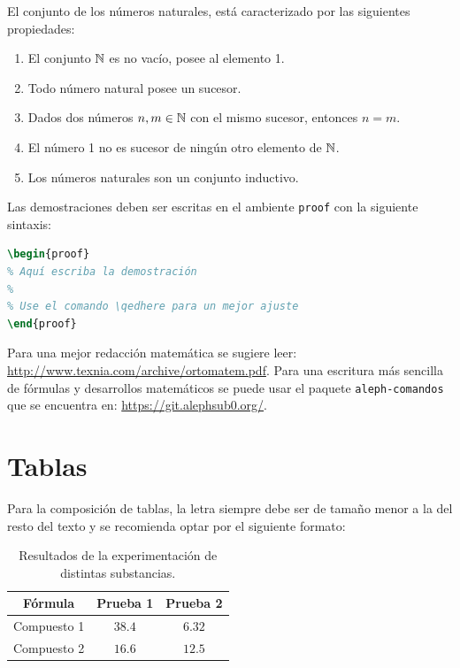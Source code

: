 \documentclass{aleph-revista}
\begin{document}
\begin{axioma}
    El conjunto de los números naturales, está caracterizado por las siguientes propiedades:
    \begin{enumerate}
    \item
        El conjunto $\mathbb{N}$ es no vacío, posee al elemento 1.
    \item
        Todo número natural posee un sucesor.
    \item
        Dados dos números $n,m\in\mathbb{N}$ con el mismo sucesor, entonces $n=m$.
    \item
        El número 1 no es sucesor de ningún otro elemento de $\mathbb{N}$.
    \item
        Los números naturales son un conjunto inductivo.
    \end{enumerate}
\end{axioma}

Las demostraciones deben ser escritas en el ambiente \texttt{proof} con la siguiente sintaxis:

\begin{lstlisting}[language=TeX]
\begin{proof}
% Aquí escriba la demostración
%
% Use el comando \qedhere para un mejor ajuste
\end{proof}
\end{lstlisting}

Para una mejor redacción matemática se sugiere leer: \url{http://www.texnia.com/archive/ortomatem.pdf}. Para una escritura más sencilla de fórmulas y desarrollos matemáticos se puede usar el paquete \texttt{aleph-comandos} que se encuentra en: \url{https://git.alephsub0.org/}. 

\section{Tablas}

Para la composición de tablas, la letra siempre debe ser de tamaño menor a la del resto del texto y se recomienda optar por el siguiente formato:

\begin{table}[H]
    \centering\small
    \begin{tabular}{ccc}
    \toprule
        \textbf{Fórmula} & \textbf{Prueba 1} & \textbf{Prueba 2} \\ 
    \midrule
        Compuesto 1 & $38.4$  &  $6.32$\\ 
        Compuesto 2 & $16.6$ & $12.5$ \\ 
    \bottomrule
    \end{tabular}
    \label{tab:01}
    \caption{Resultados de la experimentación de distintas substancias.}
\end{table}
\end{document}
